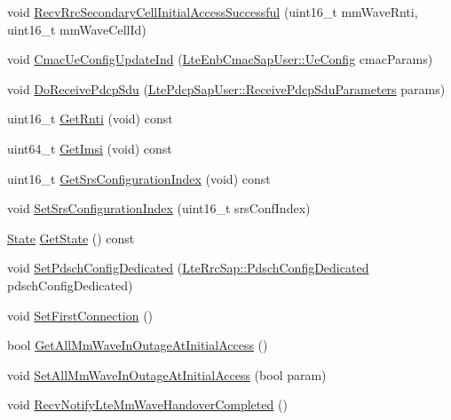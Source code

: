 \begin{DoxyCompactItemize}
void \hyperlink{classns3_1_1UeManager_a98a8c4fbacd2bbe62487e9ef228a0517}{Recv\+Rrc\+Secondary\+Cell\+Initial\+Access\+Successful} (uint16\+\_\+t mm\+Wave\+Rnti, uint16\+\_\+t mm\+Wave\+Cell\+Id)
\item 
void \hyperlink{classns3_1_1UeManager_a3502fd922f08dc8116176a63060d8067}{Cmac\+Ue\+Config\+Update\+Ind} (\hyperlink{structns3_1_1LteEnbCmacSapUser_1_1UeConfig}{Lte\+Enb\+Cmac\+Sap\+User\+::\+Ue\+Config} cmac\+Params)
\item 
void \hyperlink{classns3_1_1UeManager_a703c64cf61f89afeb54461985d47ac44}{Do\+Receive\+Pdcp\+Sdu} (\hyperlink{structns3_1_1LtePdcpSapUser_1_1ReceivePdcpSduParameters}{Lte\+Pdcp\+Sap\+User\+::\+Receive\+Pdcp\+Sdu\+Parameters} params)
\item 
uint16\+\_\+t \hyperlink{classns3_1_1UeManager_a351a66d86df2e5e4692da3a59e22773c}{Get\+Rnti} (void) const 
\item 
uint64\+\_\+t \hyperlink{classns3_1_1UeManager_a9609913bb407b13da17a55d9013e8e10}{Get\+Imsi} (void) const 
\item 
uint16\+\_\+t \hyperlink{classns3_1_1UeManager_af7a84dcad94adbc23b87773d336bb664}{Get\+Srs\+Configuration\+Index} (void) const 
\item 
void \hyperlink{classns3_1_1UeManager_a8bc48fe95a32d47ef0a7a36fbaa4339b}{Set\+Srs\+Configuration\+Index} (uint16\+\_\+t srs\+Conf\+Index)
\item 
\hyperlink{classns3_1_1UeManager_a2f4085fdd18d7125c27da44a5b8b6808}{State} \hyperlink{classns3_1_1UeManager_a401868bb61523c594c69024e2231467a}{Get\+State} () const 
\item 
void \hyperlink{classns3_1_1UeManager_af41111c80a44e534b52ddf4d838edb0c}{Set\+Pdsch\+Config\+Dedicated} (\hyperlink{structns3_1_1LteRrcSap_1_1PdschConfigDedicated}{Lte\+Rrc\+Sap\+::\+Pdsch\+Config\+Dedicated} pdsch\+Config\+Dedicated)
\item 
void \hyperlink{classns3_1_1UeManager_a3aa975452dea86a4acfefb50eca6af28}{Set\+First\+Connection} ()
\item 
bool \hyperlink{classns3_1_1UeManager_ad03e7afb123a9874ad50ec518b528b14}{Get\+All\+Mm\+Wave\+In\+Outage\+At\+Initial\+Access} ()
\item 
void \hyperlink{classns3_1_1UeManager_abb69288e493a0ca82c78dbfb0177ad45}{Set\+All\+Mm\+Wave\+In\+Outage\+At\+Initial\+Access} (bool param)
\item 
void \hyperlink{classns3_1_1UeManager_a126de0980408212bb991bfce59977dcb}{Recv\+Notify\+Lte\+Mm\+Wave\+Handover\+Completed} ()
\item 

\end{DoxyCompactItemize}
